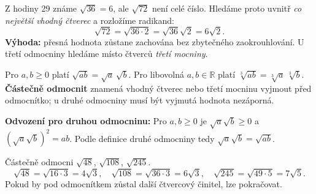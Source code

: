\documentclass[11pt,a4paper]{article}
\begin{document}

Z hodiny 29 známe $\sqrt{36}=6$, ale $\sqrt{72}$ není celé číslo.
Hledáme proto uvnitř \emph{co největší vhodný čtverec} a rozložíme radikand:
\[
\sqrt{72}=\sqrt{36\cdot2}=\sqrt{36}\sqrt2=\boxed{6\sqrt2}.
\]
\textbf{Výhoda:} přesná hodnota zůstane zachována bez zbytečného zaokrouhlování.
U třetí odmocniny hledáme místo čtverců \emph{třetí mocniny}.

\begin{definiceBox}[title={Pravidlo: odmocnina ze součinu}]
Pro $a,b\ge0$ platí $\sqrt{ab}=\sqrt a\,\sqrt b$.
Pro libovolná $a,b\in\mathbb R$ platí
$\sqrt[3]{ab}=\sqrt[3]a\,\sqrt[3]b$.
\textbf{Částečně odmocnit} znamená vhodný čtverec nebo třetí mocninu
vyjmout před odmocnítko; u druhé odmocniny musí být vyjmutá hodnota nezáporná.
\end{definiceBox}
\textbf{Odvození pro druhou odmocninu:}
Pro $a,b\ge0$ je $\sqrt a\sqrt b\ge0$ a
$(\sqrt a\sqrt b)^2=ab$. Podle definice druhé odmocniny tedy
$\sqrt a\sqrt b=\sqrt{ab}$.

\begin{prikladReseniBox}[breakable=false,title={Příklad 1: vyjmutí čtverce}]
Částečně odmocni $\sqrt{48}$, $\sqrt{108}$, $\sqrt{245}$.
\tcblower
\[
\sqrt{48}=\sqrt{16\cdot3}=4\sqrt3,\quad
\sqrt{108}=\sqrt{36\cdot3}=6\sqrt3,\quad
\sqrt{245}=\sqrt{49\cdot5}=7\sqrt5.
\]
Pokud by pod odmocnítkem zůstal další čtvercový činitel, lze pokračovat.
\end{prikladReseniBox}
\end{document}
